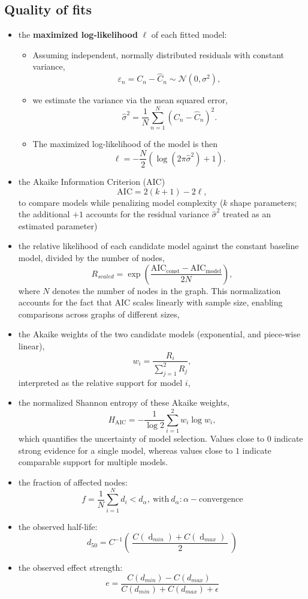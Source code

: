 \documentclass[fleqn,10pt]{olplainarticle}
\begin{document}
\subsection*{Quality of fits}
\begin{itemize}
    \item the \textbf{maximized log-likelihood} $\ell$ of each fitted model:
    \begin{itemize}
        \item Assuming independent, normally distributed residuals with constant variance, 
        $$ \varepsilon_n = C_n - \widehat{C}_n \sim \mathcal{N}(0,\sigma^2), $$
        \item we estimate the variance via the mean squared error,
        $$ \widehat{\sigma}^2 = \frac{1}{N} \sum_{n=1}^{N} (C_n - \widehat{C}_n)^2.$$
        \item The maximized log-likelihood of the model is then
        $$\ell = -\frac{N}{2} \left( \log(2\pi \widehat{\sigma}^2) + 1 \right).$$
    \end{itemize}
    \item the Akaike Information Criterion (AIC) $$\mathrm{AIC} = 2(k+1) - 2\ell,$$ to compare models while penalizing model complexity ($k$ shape parameters; the additional $+1$ accounts for the residual variance $\widehat{\sigma}^2$ treated as an estimated parameter)
    \item the relative likelihood of each candidate model against the constant baseline model, divided by the number of nodes, 
    $$ R_{scaled} = \exp(\frac{\mathrm{AIC}_{\mathrm{const}} - \mathrm{AIC}_{\mathrm{model}}}{2N}),$$
    where $N$ denotes the number of nodes in the graph. This normalization accounts for the fact that AIC scales linearly with sample size, enabling comparisons across graphs of different sizes,
    \item the Akaike weights of the two candidate models (exponential, and piece-wise linear), 
    $$w_i= \frac{R_{i}}{\sum_{j=1}^{2}R_{j}},$$
    interpreted as the relative support for model $i$,
    \item the normalized Shannon entropy of these Akaike weights, 
    $$H_{\mathrm{AIC}} = - \frac{1}{\log 2} \sum_{i=1}^{2} w_i \log w_i,$$ 
    which quantifies the uncertainty of model selection. Values close to $0$ indicate strong evidence for a single model, whereas values close to $1$ indicate comparable support for multiple models.
\end{itemize}

\begin{itemize}
    \item the fraction of affected nodes:
    $$f= \frac{1}{N}\sum_{i=1}^{N}d_i<d_\alpha,~\text{with}~
    d_\alpha:\alpha-\text{convergence}
    $$ 
    \item the observed half-life:
    $$d_{50}={C}^{-1}\left(\ \frac{C\left(\operatorname{d}_{min}\right)+C\left(\operatorname{d}_{max}\right)\mathrm{\ } }{2}\ \right)$$
    \item the observed effect strength:
    $$e= \frac{C\left(d_{min}\right)-C\left(d_{max}\right)\mathrm{\ } }{C\left(d_{min}\right)+C\left(d_{max}\right)+\epsilon}$$
\end{itemize}
\end{document}
